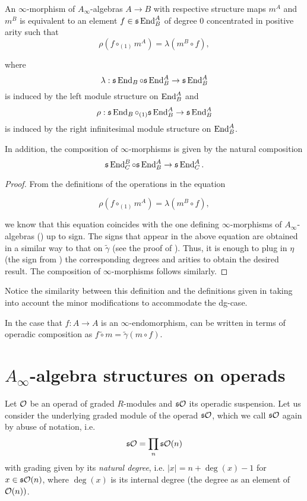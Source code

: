 \documentclass[Thesis.tex]{subfiles}
\begin{document}
\begin{lem}\label{infinitymorphisms}
An $\infty$-morphism of $A_\infty$-algebras $A\to B$ with respective structure maps $m^A$ and $m^B$ is equivalent to an element $f\in\mathfrak{s}\operatorname{End}^A_B$ of degree 0 concentrated in positive arity such that \[\rho(f\circ_{(1)}m^A)=\lambda(m^B\circ f),\] 

where \[\lambda:\mathfrak{s}\operatorname{End}_B\circ \mathfrak{s}\operatorname{End}^A_B\to \mathfrak{s}\operatorname{End}^A_B\] is induced by the left module structure on $\operatorname{End}^A_B$ and \[\rho:\mathfrak{s}\operatorname{End}_B\circ_{(1)}\mathfrak{s}\operatorname{End}^A_B\to \mathfrak{s}\operatorname{End}^A_B\] is induced by the right infinitesimal module structure on $\operatorname{End}^A_B$. 

In addition, the composition of $\infty$-morphisms is given by the natural composition \[\mathfrak{s}\operatorname{End}^B_C\circ \mathfrak{s}\operatorname{End}^A_B\to \mathfrak{s}\operatorname{End}^A_C.\]
\end{lem}
\begin{proof}
From the definitions of the operations in the equation

\begin{equation}\label{operadicmorphism}
\rho(f\circ_{(1)}m^A)=\lambda(m^B\circ f),
\end{equation} 

we know that this equation coincides with the one defining $\infty$-morphisms of $A_\infty$-algebras () up to sign. The signs that appear in the above equation are obtained in a similar way to that on $\tilde{\gamma}$ (see the proof of ). Thus, it is enough to plug in $\eta$ (the sign from ) the corresponding degrees and arities to obtain the desired result. The composition of $\infty$-morphisms follows similarly.
\end{proof}
Notice the similarity between this definition and the definitions given in \cite[Section 10.2.4]{lodayvallette} taking into account the minor modifications to accommodate the dg-case.

In the case that $f:A\to A$ is an $\infty$-endomorphism,  can be written in terms of operadic composition as $f\tilde{\circ}m=\tilde{\gamma}(m\circ f)$. 


\section{$A_\infty$-algebra structures on operads}\label{sect2}


Let ${\mathcal O}$ be an operad of graded $R$-modules and $\mathfrak{s}{\mathcal O}$ its operadic suspension. Let us consider the underlying graded module of the operad $\mathfrak{s}{\mathcal O}$, which we  call $\mathfrak{s}{\mathcal O}$ again by abuse of notation, i.e. \[\mathfrak{s}{\mathcal O}=\prod_n \mathfrak{s}{\mathcal O}(n)\] with grading given by its \emph{natural degree}, i.e. $|x|=n+\deg(x)-1$ for $x\in \mathfrak{s}{\mathcal O}(n)$, where $\deg(x)$ is its internal degree (the degree as an element of ${\mathcal O}(n))$. 
\end{document}
